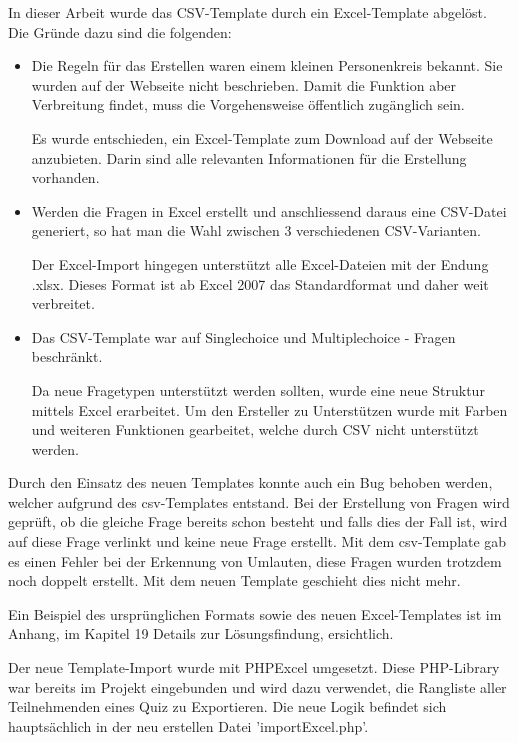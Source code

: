 In dieser Arbeit wurde das CSV-Template durch ein Excel-Template abgelöst. Die Gründe dazu sind die folgenden:
\begin{itemize}
	\item Die Regeln für das Erstellen waren einem kleinen Personenkreis bekannt. Sie wurden auf der Webseite nicht beschrieben. Damit die Funktion aber Verbreitung findet, muss die Vorgehensweise öffentlich zugänglich sein.
	
	Es wurde entschieden, ein Excel-Template zum Download auf der Webseite anzubieten. Darin sind alle relevanten Informationen für die Erstellung vorhanden.
	
	\item Werden die Fragen in Excel erstellt und anschliessend daraus eine CSV-Datei generiert, so hat man die Wahl zwischen 3 verschiedenen CSV-Varianten.
	
	Der Excel-Import hingegen unterstützt alle Excel-Dateien mit der Endung .xlsx. Dieses Format ist ab Excel 2007 das Standardformat und daher weit verbreitet.
	\cite{microsoft2016}
	
	\item Das CSV-Template war auf Singlechoice und Multiplechoice - Fragen beschränkt.
	
	Da neue Fragetypen unterstützt werden sollten, wurde eine neue Struktur mittels Excel erarbeitet. Um den Ersteller zu Unterstützen wurde mit Farben und weiteren Funktionen gearbeitet, welche durch CSV nicht unterstützt werden.

\end{itemize}

Durch den Einsatz des neuen Templates konnte auch ein Bug behoben werden, welcher aufgrund des csv-Templates entstand. Bei der Erstellung von Fragen wird geprüft, ob die gleiche Frage bereits schon besteht und falls dies der Fall ist, wird auf diese Frage verlinkt und keine neue Frage erstellt. Mit dem csv-Template gab es einen Fehler bei der Erkennung von Umlauten, diese Fragen wurden trotzdem noch doppelt erstellt. Mit dem neuen Template geschieht dies nicht mehr.

Ein Beispiel des ursprünglichen Formats sowie des neuen Excel-Templates ist im Anhang, im Kapitel 19 Details zur Lösungsfindung, ersichtlich.

Der neue Template-Import wurde mit PHPExcel \cite{phpexcel} umgesetzt. Diese PHP-Library war bereits im Projekt eingebunden und wird dazu verwendet, die Rangliste aller Teilnehmenden eines Quiz zu Exportieren. Die neue Logik befindet sich hauptsächlich in der neu erstellen Datei 'importExcel.php'.

